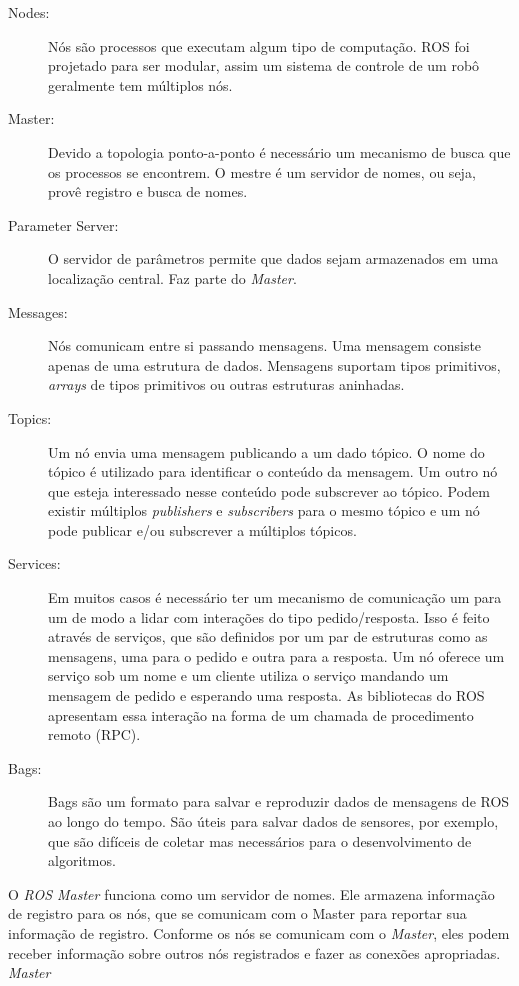 \begin{description}
\item[Nodes:] Nós são processos que executam algum tipo de computação. ROS foi projetado para ser modular, assim um sistema de controle de um robô geralmente tem múltiplos nós. 

\item[Master:] Devido a topologia ponto-a-ponto é necessário um mecanismo de busca que os processos se encontrem. O mestre é um servidor de nomes, ou seja, provê registro e busca de nomes.

\item[Parameter Server:] O servidor de parâmetros permite que dados sejam armazenados em uma localização central. Faz parte do \textit{Master}.

\item[Messages:] Nós comunicam entre si passando mensagens. Uma mensagem consiste apenas de uma estrutura de dados. Mensagens suportam tipos primitivos, \textit{arrays} de tipos primitivos ou outras estruturas aninhadas. 

\item[Topics:] Um nó envia uma mensagem publicando a um dado tópico. O nome do tópico é utilizado para identificar o conteúdo da mensagem. Um outro nó que esteja interessado nesse conteúdo pode subscrever ao tópico. Podem existir múltiplos \textit{publishers} e \textit{subscribers} para o mesmo tópico e um nó pode publicar e/ou subscrever a múltiplos tópicos. 

\item[Services:] Em muitos casos é necessário ter um mecanismo de comunicação um para um de modo a lidar com interações do tipo pedido/resposta. Isso é feito através de serviços, que são definidos por um par de estruturas como as mensagens, uma para o pedido e outra para a resposta. Um nó oferece um serviço sob um nome e um cliente utiliza o serviço mandando um mensagem de pedido e esperando uma resposta. As bibliotecas do ROS apresentam essa interação na forma de um chamada de procedimento remoto (RPC).

\item[Bags:] Bags são um formato para salvar e reproduzir dados de mensagens de ROS ao longo do tempo. São úteis para salvar dados de sensores, por exemplo, que são difíceis de coletar mas necessários para o desenvolvimento de algoritmos. 
\end{description}

O \textit{ROS Master} funciona como um servidor de nomes. Ele armazena informação de registro para os nós, que se comunicam com o Master para reportar sua informação de registro. Conforme os nós se comunicam com o \textit{Master}, eles podem receber informação sobre outros nós registrados e fazer as conexões apropriadas. \textit{Master} 


